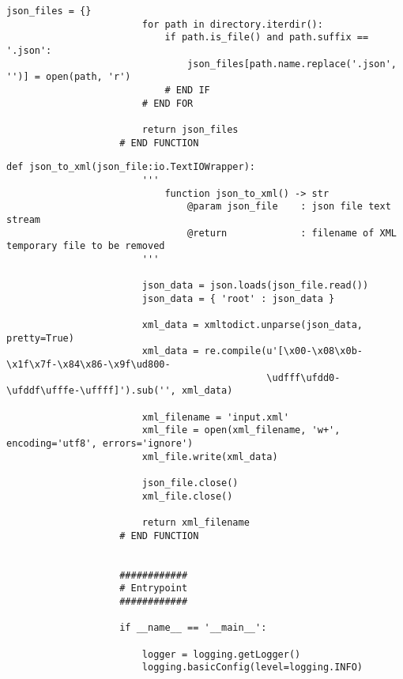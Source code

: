 \begin{minipage}{\linewidth}
\begin{lstlisting}[language=lPython]
                        json_files = {}
                        for path in directory.iterdir():
                            if path.is_file() and path.suffix == '.json':
                                json_files[path.name.replace('.json', '')] = open(path, 'r')
                            # END IF
                        # END FOR
                    
                        return json_files
                    # END FUNCTION
                \end{lstlisting}
            \end{minipage}
            \begin{minipage}{\linewidth}
                \begin{lstlisting}[language=lPython]
                    def json_to_xml(json_file:io.TextIOWrapper):
                        '''
                            function json_to_xml() -> str
                                @param json_file    : json file text stream
                                @return             : filename of XML temporary file to be removed
                        '''
                    
                        json_data = json.loads(json_file.read())
                        json_data = { 'root' : json_data }
                    
                        xml_data = xmltodict.unparse(json_data, pretty=True)
                        xml_data = re.compile(u'[\x00-\x08\x0b-\x1f\x7f-\x84\x86-\x9f\ud800-
                                              \udfff\ufdd0-\ufddf\ufffe-\uffff]').sub('', xml_data)
                    
                        xml_filename = 'input.xml'
                        xml_file = open(xml_filename, 'w+', encoding='utf8', errors='ignore')
                        xml_file.write(xml_data)
                    
                        json_file.close()
                        xml_file.close()
                    
                        return xml_filename
                    # END FUNCTION
                    
                    
                    ############
                    # Entrypoint
                    ############
                    
                    if __name__ == '__main__':
                    
                        logger = logging.getLogger()
                        logging.basicConfig(level=logging.INFO)
                    

\end{lstlisting}
\end{minipage}

